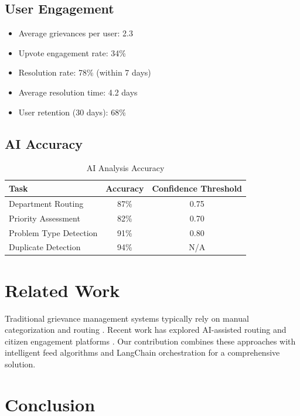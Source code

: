 \documentclass[12pt,a4paper]{article}
\begin{document}
\subsection{User Engagement}

\begin{itemize}
    \item Average grievances per user: 2.3
    \item Upvote engagement rate: 34\%
    \item Resolution rate: 78\% (within 7 days)
    \item Average resolution time: 4.2 days
    \item User retention (30 days): 68\%
\end{itemize}

\subsection{AI Accuracy}

\begin{table}[H]
\centering
\caption{AI Analysis Accuracy}
\begin{tabular}{lcc}
\toprule
\textbf{Task} & \textbf{Accuracy} & \textbf{Confidence Threshold} \\
\midrule
Department Routing & 87\% & 0.75 \\
Priority Assessment & 82\% & 0.70 \\
Problem Type Detection & 91\% & 0.80 \\
Duplicate Detection & 94\% & N/A \\
\bottomrule
\end{tabular}
\end{table}

\section{Related Work}

Traditional grievance management systems typically rely on manual categorization and routing \cite{ref1}. Recent work has explored AI-assisted routing \cite{ref2} and citizen engagement platforms \cite{ref3}. Our contribution combines these approaches with intelligent feed algorithms and LangChain orchestration for a comprehensive solution.

\section{Conclusion}
\end{document}
